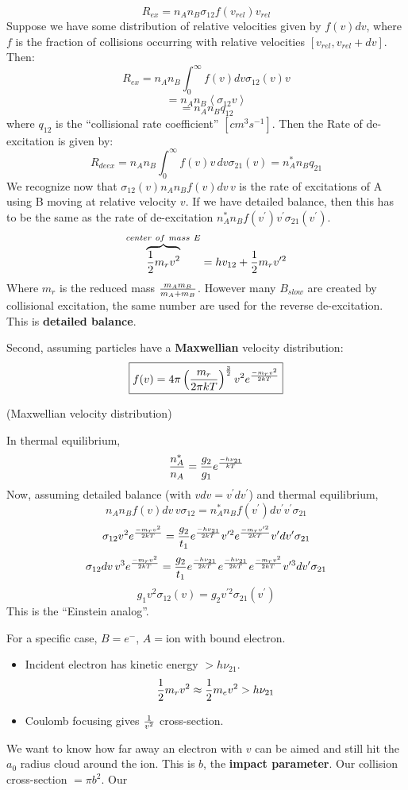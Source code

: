 \documentclass[11pt]{article}
\def\hf{{1 \over 2}}
\def\inv#1{{1 \over #1}}
\def\mean#1{\left\langle #1\right\rangle}
\def\sigot{\sigma_{12}}
\def\sigto{\sigma_{21}}
\begin{document}
\def\rex{R_{ex}}
\def\vrel{v_{rel}}
$$\rex = n_An_B\sigma_{12}f(\vrel)\vrel$$
Suppose we have some distribution of relative velocities given by $f(v)dv$,
where $f$ is the fraction of collisions occurring with relative velocities
$[\vrel, \vrel +dv]$.  Then:
$$\rex = n_An_B\int_0^{\infty}f(v)dv\sigot(v)v$$
$$=n_An_B \mean{\sigot v}$$
\def\qot{q_{12}}
\def\qto{q_{21}}
$$=n_An_B\qot$$
where $\qot$ is the ``collisional rate coefficient'' $[cm^3s^{-1}]$.  Then the
Rate of de-excitation is given by:
$$R_{deex} = n_An_B\int_0^\infty{f(v)v\,dv\sigma_{21}(v) = n_A^*n_B\qto}$$
We recognize now that $\sigot(v)n_An_Bf(v)dv\,v$ is the rate of excitations of 
A using B moving at relative velocity $v$.  If we have detailed balance,
then this has to be the same as the rate of de-excitation
$n_A^*n_Bf(v^\prime)v^\prime\sigto(v^\prime)$.
$$\overbrace{\hf m_rv^2}^{center\ of\ mass\ E} = hv_{12} + \hf m_rv^{\prime2}$$
Where $m_r$ is the reduced mass $m_Am_B\over m_A+m_B$. However many $B_{slow}$
are created by collisional excitation, the same number are used for the
reverse de-excitation.  This is {\bf detailed balance}.\par
Second, assuming particles have a {\bf Maxwellian} velocity
distribution:
$$\boxed{f(v)=4\pi\left({m_r\over 2\pi kT}\right)^{3\over 2}v^2
e^{-m_rv^2\over 2kT}}$$
\centerline{(Maxwellian velocity distribution)}
In thermal equilibrium,
$${n_A^*\over n_A} = {g_2\over g_1}e^{-h\nu_{21}\over kT}$$
Now, assuming detailed balance (with $v dv=v^\prime dv^\prime$) and thermal equilibrium,
$$n_An_Bf(v)dv\,v\sigot=n_A^*n_Bf(v^\prime)dv^\prime v^\prime \sigto$$
\def\emvkt{e^{-m_rv^2\over2kT}}
\def\emvpkt{e^{-m_rv^{\prime2}\over2kT}}
\def\ehvkt{e^{-h\nu_{21}\over2kT}}
$$\sigot v^2\emvkt = {g_2\over t_1}\ehvkt v^{\prime2}\emvpkt v^\prime 
dv^\prime\sigto$$
$$\sigot dv\,v^3 \emvkt = {g_2\over t_1}\ehvkt \ehvkt \emvkt v^{\prime3}
dv^\prime \sigto$$
$$\boxed{g_1v^2\sigot(v) = g_2v^{\prime2}\sigto(v^\prime)}$$
This is the ``Einstein analog''.\par
For a specific case, $B=e^-$, $A=$ion with bound electron.
\begin{itemize}
\item Incident electron has kinetic energy $>h\nu_{21}$.
$$\hf m_rv^2 \approx \hf m_ev^2 > h\nu_{21}$$
\item  Coulomb focusing gives $\inv{v^2}$ cross-section.
\end{itemize}
We want to know how far away an electron with $v$ can be aimed
and still hit the $a_0$ radius cloud around the ion.  This is $b$, the
{\bf impact parameter}.  Our collision cross-section $=\pi b^2$.  Our
\end{document}
